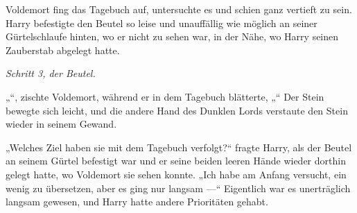 Voldemort fing das Tagebuch auf, untersuchte es und schien ganz vertieft zu sein.
Harry befestigte den Beutel so leise und unauffällig wie möglich an seiner Gürtelschlaufe hinten, wo er nicht zu sehen war, in der Nähe, wo Harry seinen Zauberstab abgelegt hatte.

\emph{Schritt 3, der Beutel.}

„“, zischte Voldemort, während er in dem Tagebuch blätterte, „“
Der Stein bewegte sich leicht, und die andere Hand des Dunklen Lords verstaute den Stein wieder in seinem Gewand.

„Welches Ziel haben sie mit dem Tagebuch verfolgt?“ fragte Harry, als der Beutel an seinem Gürtel befestigt war und er seine beiden leeren Hände wieder dorthin gelegt hatte, wo Voldemort sie sehen konnte.
„Ich habe am Anfang versucht, ein wenig zu übersetzen, aber es ging nur langsam —“
Eigentlich war es unerträglich langsam gewesen, und Harry hatte andere Prioritäten gehabt.

